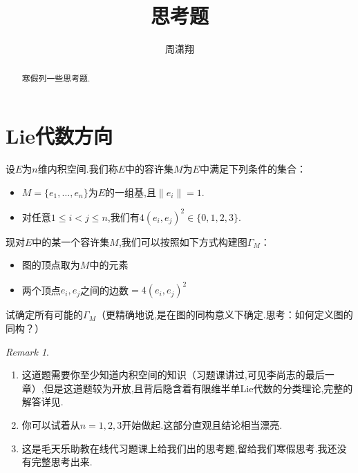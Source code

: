 \documentclass[11pt,A4paper,oneside]{amsart}
\numberwithin{equation}{section}
\theoremstyle{plain}
\theoremstyle{plain}
\numberwithin{equation}{section}
\theoremstyle{remark}
\newtheorem{remark}[theorem]{Remark}
\begin{document}
\title[]{\LARGE 思考题}


\author[]{\large 周潇翔}
\address{School of Mathematical Sciences\\
University of Science and Technology of China\\
Hefei, 230026\\ P.R. China\\}
\maketitle




\begin{abstract}
寒假列一些思考题.
\end{abstract}








\section{Lie代数方向}
设$E$为$n$维内积空间.我们称$E$中的容许集$M$为$E$中满足下列条件的集合：
\begin{itemize}
	\item $M=\{e_1,\ldots,e_n\}$为$E$的一组基,且$\lVert e_i\rVert = 1$.
	\item 对任意$1 \leqslant i<j\leqslant n$,我们有$4(e_i,e_j)^2 \in \{0,1,2,3\}$.
\end{itemize}
现对$E$中的某一个容许集$M$,我们可以按照如下方式构建图$\Gamma_M$：
\begin{itemize}
	\item 图的顶点取为$M$中的元素
	\item 两个顶点$e_i,e_j$之间的边数$=4(e_i,e_j)^2$
\end{itemize}
试确定所有可能的$\Gamma_M$（更精确地说,是在图的同构意义下确定.思考：如何定义图的同构？）
\begin{remark}\
	\begin{enumerate}
		\item 这道题需要你至少知道内积空间的知识（习题课讲过,可见李尚志的最后一章）,但是这道题较为开放,且背后隐含着有限维半单Lie代数的分类理论,完整的解答详见\cite[p58]{Hum78}.
		\item 你可以试着从$n=1,2,3$开始做起.这部分直观且结论相当漂亮.
		\item 这是毛天乐助教在线代习题课上给我们出的思考题,留给我们寒假思考.我还没有完整思考出来.
	\end{enumerate}
\end{remark}
\end{document}
